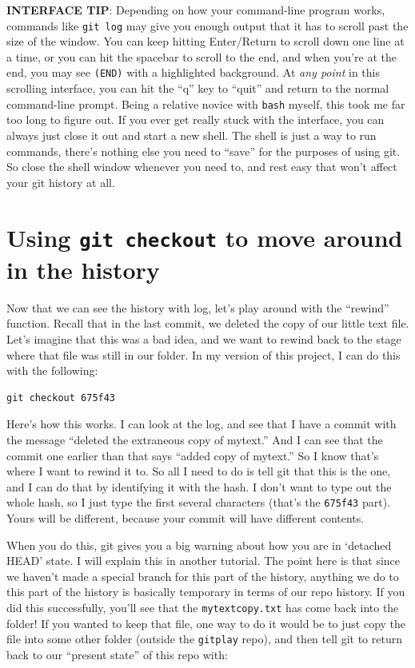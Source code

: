 \documentclass{article}
\begin{document}
\textbf{INTERFACE TIP}: Depending on how your command-line program works, commands like \texttt{git log} may give you enough output that it has to scroll past the size of the window. You can keep hitting Enter/Return to scroll down one line at a time, or you can hit the spacebar to scroll to the end, and when you're at the end, you may see \texttt{(END)} with a highlighted background. At \emph{any point} in this scrolling interface, you can hit the ``q'' key to ``quit'' and return to the normal command-line prompt.  Being a relative novice with \texttt{bash} myself, this took me far too long to figure out.  If you ever get really stuck with the interface, you can always just close it out and start a new shell. The shell is just a way to run commands, there's nothing else you need to ``save'' for the purposes of using git. So close the shell window whenever you need to, and rest easy that won't affect your git history at all.
\section{Using \texttt{git checkout} to move around in the history}
\label{sec-9}

Now that we can see the history with log, let's play around with the ``rewind'' function. Recall that in the last commit, we deleted the copy of our little text file. Let's imagine that this was a bad idea, and we want to rewind back to the stage where that file was still in our folder. In my version of this project, I can do this with the following:


\begin{verbatim}
git checkout 675f43
\end{verbatim}

Here's how this works. I can look at the log, and see that I have a commit with the message ``deleted the extraneous copy of mytext.''  And I can see that the commit one earlier than that says ``added copy of mytext.'' So I know that's where I want to rewind it to.  So all I need to do is tell git that this is the one, and I can do that by identifying it with the hash.  I don't want to type out the whole hash, so I just type the first several characters (that's the \texttt{675f43} part).  Yours will be different, because your commit will have different contents.

When you do this, git gives you a big warning about how you are in `detached HEAD' state. I will explain this in another tutorial. The point here is that since we haven't made a special branch for this part of the history, anything we do to this part of the history is basically temporary in terms of our repo history.  If you did this successfully, you'll see that the \texttt{mytextcopy.txt} has come back into the folder!  If you wanted to keep that file, one way to do it would be to just copy the file into some other folder (outside the \texttt{gitplay} repo), and then tell git to return back to our ``present state'' of this repo with:
\end{document}
